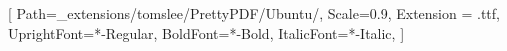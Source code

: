 \setsansfont{Ubuntu}[
    Path=_extensions/tomslee/PrettyPDF/Ubuntu/,
    Scale=0.9,
    Extension = .ttf,
    UprightFont=*-Regular,
    BoldFont=*-Bold,
    ItalicFont=*-Italic,
    ]

